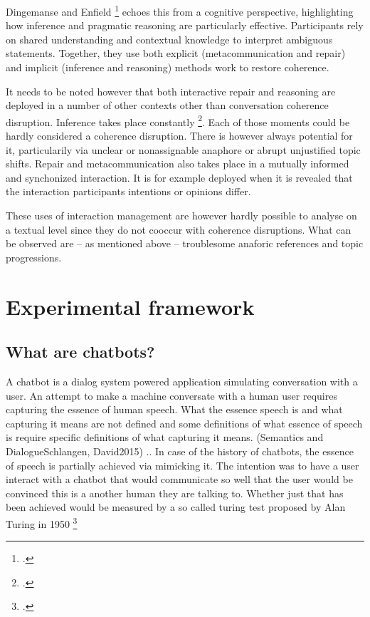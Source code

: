 \documentclass[12pt]{report}
\begin{document}
{\par
Dingemanse and Enfield \footcite{DINGEMANSE202430} echoes this from a cognitive perspective,
highlighting how inference and pragmatic reasoning are particularly effective.
Participants rely on shared understanding and contextual knowledge to interpret ambiguous statements.
Together, they use both
explicit (metacommunication and repair) and
implicit (inference and reasoning)
methods work to restore coherence.

\par
It needs to be noted however that both interactive repair and reasoning are
deployed in a number of other contexts
other than conversation coherence disruption.
Inference takes place constantly \footcite{garfinkelstudies}.
Each of those moments could be hardly considered a coherence disruption.
There is however always potential for it,
particularily via unclear or nonassignable anaphore or abrupt unjustified topic shifts.
Repair and metacommunication also takes place in a mutually informed and synchonized interaction.
It is for example deployed when it is revealed
that the interaction participants intentions or opinions differ.

\par
These uses of interaction management are however
hardly possible to analyse on a textual level
since they do not cooccur with coherence disruptions.
What can be observed are – as mentioned above –
troublesome anaforic references and topic progressions.



\chapter{Experimental framework}

\section{What are chatbots?}
\par
A chatbot is a dialog system powered application simulating conversation with a user.
An attempt to make a machine conversate with a human user requires capturing the essence of human speech.
What the essence speech is and what capturing it means are not defined and
some definitions of what essence of speech is
require specific definitions of what capturing it means.
(Semantics and DialogueSchlangen, David2015) ..
In case of the history of chatbots,
the essence of speech is partially achieved
via mimicking it.
The intention was to have a user interact with a chatbot
that would communicate so well that
the user would be convinced
this is a another human they are talking to.
Whether just that has been achieved would be measured by a so called turing test
proposed by Alan Turing in 1950 \footcite{turing1950computing}

}
\end{document}
